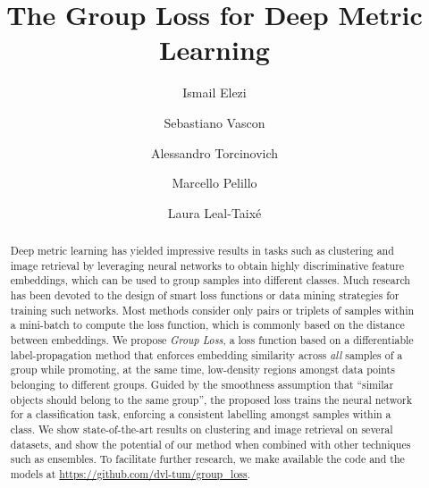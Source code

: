 \documentclass[runningheads]{llncs}
\begin{document}
\pagestyle{headings}
\mainmatter
\def\ECCVSubNumber{188}  

\title{The Group Loss for Deep Metric Learning} 

\begin{comment}
\titlerunning{ECCV-20 submission ID \ECCVSubNumber} 
\authorrunning{ECCV-20 submission ID \ECCVSubNumber} 
\author{Anonymous ECCV submission}
\institute{Paper ID \ECCVSubNumber}
\end{comment}


\author{Ismail Elezi \and
Sebastiano Vascon \and
Alessandro Torcinovich \and
Marcello Pelillo \and
Laura Leal-Taix\'{e}}
\maketitle

\begin{abstract}
Deep metric learning has yielded impressive results in tasks such as clustering and image retrieval by leveraging neural networks to obtain highly discriminative feature embeddings, which can be used to group samples into different classes.
Much research has been devoted to the design of smart loss functions or data mining strategies for training such networks. 
Most methods consider only pairs or triplets of samples within a mini-batch to compute the loss function, which is commonly based on the distance between embeddings. 
We propose {\it Group Loss}, a loss function based on a differentiable label-propagation method that enforces embedding similarity across {\it all} samples of a group while promoting, at the same time, low-density regions amongst data points belonging to different groups. 
Guided by the smoothness assumption that ``similar objects should belong to the same group'', the proposed loss trains the neural network for a classification task, enforcing a consistent labelling amongst samples within a class. We show state-of-the-art results on clustering and image retrieval on several datasets, and show the potential of our method when combined with other techniques such as ensembles. To facilitate further research, we make available the code and the models at \url{https://github.com/dvl-tum/group_loss}.

\end{abstract}
\end{document}
